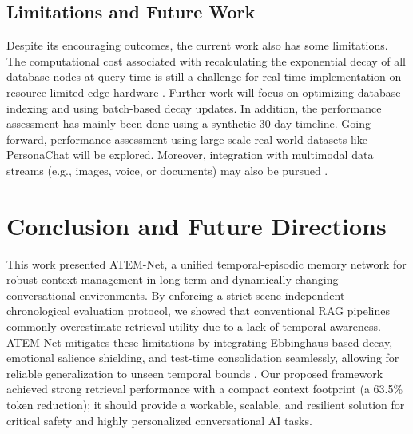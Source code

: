 \documentclass[conference]{IEEEtran}
\begin{document}
\subsection{Limitations and Future Work}
Despite its encouraging outcomes, the current work also has some limitations. The computational cost associated with recalculating the exponential decay of all database nodes at query time is still a challenge for real-time implementation on resource-limited edge hardware \cite{shi}. Further work will focus on optimizing database indexing and using batch-based decay updates. In addition, the performance assessment has mainly been done using a synthetic 30-day timeline. Going forward, performance assessment using large-scale real-world datasets like PersonaChat will be explored. Moreover, integration with multimodal data streams (e.g., images, voice, or documents) may also be pursued \cite{mem0}.

\section{Conclusion and Future Directions}
This work presented ATEM-Net, a unified temporal-episodic memory network for robust context management in long-term and dynamically changing conversational environments. By enforcing a strict scene-independent chronological evaluation protocol, we showed that conventional RAG pipelines commonly overestimate retrieval utility due to a lack of temporal awareness. ATEM-Net mitigates these limitations by integrating Ebbinghaus-based decay, emotional salience shielding, and test-time consolidation seamlessly, allowing for reliable generalization to unseen temporal bounds \cite{zhao}. Our proposed framework achieved strong retrieval performance with a compact context footprint (a 63.5\% token reduction); it should provide a workable, scalable, and resilient solution for critical safety and highly personalized conversational AI tasks.
\end{document}
